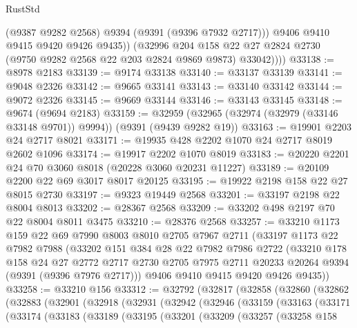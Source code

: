 \begin{lexlean}{RustStd}
\begin{coremodule}
                (@9387 @9282 @2568)
                @9394
                (@9391 (@9396 @7932 @2717)))
              @9406
              @9410
              @9415
              @9420
              @9426
              @9435))
          (@32996
            @204
            @158
            @22
            @27
            @2824
            @2730
            (@9750 @9282 @2568 @22 @203 @2824 @9869 @9873)
            @33042))))
@33138 := @8978 @2183
@33139 := @9174 @33138
@33140 := @33137 @33139
@33141 := @9048 @2326
@33142 := @9665 @33141
@33143 := @33140 @33142
@33144 := @9072 @2326
@33145 := @9669 @33144
@33146 := @33143 @33145
@33148 := @9674 (@9694 @2183)
@33159 := @32959 (@32965 (@32974 (@32979 (@33146 @33148 @9701)) @9994)) (@9391 (@9439 @9282 @19))
@33163 := @19901 @2203 @24 @2717 @8021
@33171 := @19935 @428 @2202 @1070 @24 @2717 @8019 @2602 @1096
@33174 := @19917 @2202 @1070 @8019
@33183 := @20220 @2201 @24 @70 @3060 @8018 (@20228 @3060 @20231 @11227)
@33189 := @20109 @2200 @22 @69 @3017 @8017 @20125
@33195 := @19922 @2198 @158 @22 @27 @8015 @2730
@33197 := @9323 @19449 @2568
@33201 := @33197 @2198 @22 @8004 @8013
@33202 := @28367 @2568
@33209 := @33202 @498 @2197 @70 @22 @8004 @8011 @3475
@33210 := @28376 @2568
@33257 := @33210
    @1173
    @159
    @22
    @69
    @7990
    @8003
    @8010
    @2705
    @7967
    @2711
    (@33197
      @1173
      @22
      @7982
      @7988
      (@33202
        @151
        @384
        @28
        @22
        @7982
        @7986
        @2722
        (@33210
          @178
          @158
          @24
          @27
          @2772
          @2717
          @2730
          @2705
          @7975
          @2711
          @20233
          @20264
          @9394
          (@9391 (@9396 @7976 @2717)))
        @9406
        @9410
        @9415
        @9420
        @9426
        @9435))
@33258 := @33210 @156
@33312 := @32792
    (@32817
      (@32858
        (@32860
          (@32862
            (@32883
              (@32901
                (@32918
                  (@32931
                    (@32942
                      (@32946
                        (@33159
                          (@33163
                            (@33171
                              (@33174
                                (@33183
                                  (@33189
                                    (@33195
                                      (@33201
                                        (@33209
                                          (@33257
                                            (@33258
                                              @158

\end{coremodule}
\end{lexlean}
